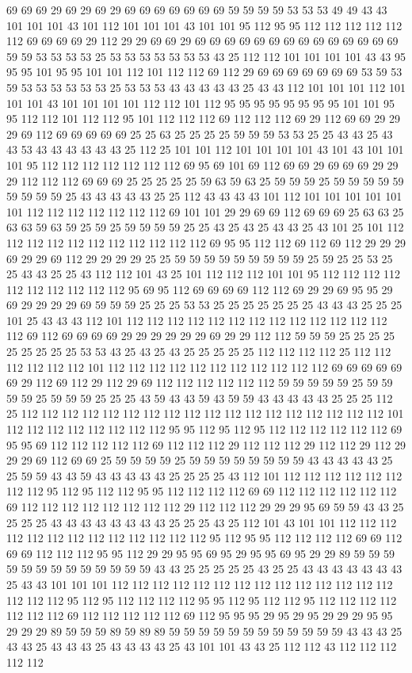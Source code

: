 69 69 69 29 69 29 69 29 69 69 69 69 69 69 69 59 59 59 59 53 53 53 49 49 43 43 101 101 101 43 101 112 101 101 101 43 101 101 95 112 95 95 112 112 112 112 112 112 69 69 69 69 29 112 29 29 69 69 29 69 69 69 69 69 69 69 69 69 69 69 69 69 69 59 59 53 53 53 53 25 53 53 53 53 53 53 53 43 25 112 112 101 101 101 101 43 43 95 95 95 101 95 95 101 101 112 101 112 112 69 112 29 69 69 69 69 69 69 69 53 59 53 59 53 53 53 53 53 53 25 53 53 53 43 43 43 43 43 25 43 43 112 101 101 101 112 101 101 101 43 101 101 101 101 112 112 101 112 95 95 95 95 95 95 95 95 101 101 95 95 112 112 101 112 112 95 101 112 112 112 69 112 112 112 69 29 112 69 69 29 29 29 69 112 69 69 69 69 69 25 25 63 25 25 25 25 59 59 59 53 53 25 25 43 43 25 43 43 53 43 43 43 43 43 43 25 112 25 101 101 112 101 101 101 101 43 101 43 101 101 101 95 112 112 112 112 112 112 112 69 95 69 101 69 112 69 69 29 69 69 69 29 29 29 112 112 112 69 69 69 25 25 25 25 25 59 63 59 63 25 59 59 59 25 59 59 59 59 59 59 59 59 59 25 43 43 43 43 43 25 25 112 43 43 43 43 101 112 101 101 101 101 101 101 112 112 112 112 112 112 112 69 101 101 29 29 69 69 112 69 69 69 25 63 63 25 63 63 59 63 59 25 59 25 59 59 59 59 25 25 43 25 43 25 43 43 25 43 101 25 101 112 112 112 112 112 112 112 112 112 112 112 69 95 95 112 112 69 112 69 112 29 29 29 69 29 29 69 112 29 29 29 29 25 25 59 59 59 59 59 59 59 59 59 25 59 25 25 53 25 25 43 43 25 25 43 112 112 101 43 25 101 112 112 112 101 101 95 112 112 112 112 112 112 112 112 112 112 95 69 95 112 69 69 69 69 112 112 69 29 29 69 95 95 29 69 29 29 29 29 69 59 59 59 25 25 25 53 53 25 25 25 25 25 25 25 43 43 43 25 25 25 101 25 43 43 43 112 101 112 112 112 112 112 112 112 112 112 112 112 112 112 112 69 112 69 69 69 69 29 29 29 29 29 29 69 29 29 112 112 59 59 59 25 25 25 25 25 25 25 25 25 53 53 43 25 43 25 43 25 25 25 25 25 112 112 112 112 25 112 112 112 112 112 112 101 112 112 112 112 112 112 112 112 112 112 112 69 69 69 69 69 69 29 112 69 112 29 112 29 69 112 112 112 112 112 112 59 59 59 59 59 25 59 59 59 59 25 59 59 59 25 25 25 43 59 43 43 59 43 59 59 43 43 43 43 43 25 25 25 112 25 112 112 112 112 112 112 112 112 112 112 112 112 112 112 112 112 112 112 101 112 112 112 112 112 112 112 112 95 95 112 95 112 95 112 112 112 112 112 112 69 95 95 69 112 112 112 112 112 69 112 112 112 29 112 112 112 29 112 112 29 112 29 29 29 69 112 69 69 25 59 59 59 59 25 59 59 59 59 59 59 59 59 43 43 43 43 43 25 25 59 59 43 43 59 43 43 43 43 43 25 25 25 25 43 112 101 112 112 112 112 112 112 112 112 95 112 95 112 112 95 95 112 112 112 112 69 69 112 112 112 112 112 112 69 112 112 112 112 112 112 112 112 29 112 112 112 29 29 29 95 69 59 59 43 43 25 25 25 25 43 43 43 43 43 43 43 43 25 25 25 43 25 112 101 43 101 101 112 112 112 112 112 112 112 112 112 112 112 112 112 95 112 95 95 112 112 112 112 69 69 112 69 69 112 112 112 95 95 112 29 29 95 95 69 95 29 95 95 69 95 29 29 89 59 59 59 59 59 59 59 59 59 59 59 59 59 43 43 25 25 25 25 25 43 25 25 43 43 43 43 43 43 43 25 43 43 101 101 101 112 112 112 112 112 112 112 112 112 112 112 112 112 112 112 112 112 95 112 95 112 112 112 112 95 95 112 95 112 112 95 112 112 112 112 112 112 112 69 112 112 112 112 112 69 112 95 95 95 29 95 29 95 29 29 29 95 95 29 29 29 89 59 59 59 89 59 89 89 59 59 59 59 59 59 59 59 59 59 59 59 43 43 43 25 43 43 25 43 43 43 25 43 43 43 43 25 43 101 101 43 43 25 112 112 43 112 112 112 112 112 